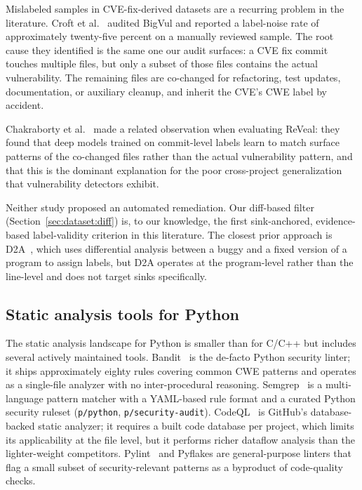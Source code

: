 Mislabeled samples in CVE-fix-derived datasets are a recurring
problem in the literature. Croft et al.~\cite{croft} audited
BigVul and reported a label-noise rate of approximately twenty-five
percent on a manually reviewed sample. The root cause they identified
is the same one our audit surfaces: a CVE fix commit touches multiple
files, but only a subset of those files contains the actual
vulnerability. The remaining files are co-changed for refactoring,
test updates, documentation, or auxiliary cleanup, and inherit the
CVE's CWE label by accident.

Chakraborty et al.~\cite{reveal} made a related
observation when evaluating ReVeal: they found that deep models
trained on commit-level labels learn to match surface patterns of the
co-changed files rather than the actual vulnerability pattern, and
that this is the dominant explanation for the poor cross-project
generalization that vulnerability detectors exhibit.

Neither study proposed an automated remediation. Our diff-based
filter (Section~\ref{sec:dataset:diff}) is, to our knowledge, the
first sink-anchored, evidence-based label-validity criterion in this
literature. The closest prior approach is D2A~\cite{d2a}, which
uses differential analysis between a buggy and a fixed version of a
program to assign labels, but D2A operates at the program-level rather
than the line-level and does not target sinks specifically.

\subsection{Static analysis tools for Python}
\label{sec:related:sast}

The static analysis landscape for Python is smaller than for C/C++
but includes several actively maintained tools. Bandit~\cite{bandit}
is the de-facto Python security linter; it ships approximately eighty
rules covering common CWE patterns and operates as a single-file
analyzer with no inter-procedural reasoning. Semgrep~\cite{semgrep}
is a multi-language pattern matcher with a YAML-based rule format and
a curated Python security ruleset (\texttt{p/python}, \texttt{p/security-audit}).
CodeQL~\cite{codeql} is GitHub's database-backed static analyzer;
it requires a built code database per project, which limits its
applicability at the file level, but it performs richer dataflow
analysis than the lighter-weight competitors. Pylint~\cite{pylint}
and Pyflakes are general-purpose linters that flag a small subset of
security-relevant patterns as a byproduct of code-quality checks.

